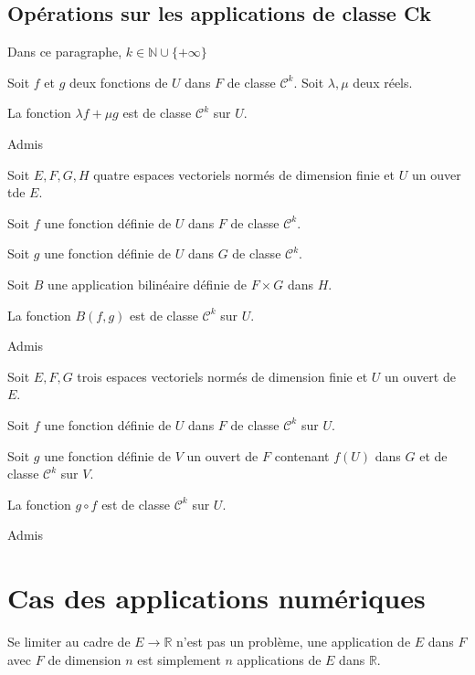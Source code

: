 \documentclass[a4paper,12pt]{book}
\newcommand{\Prop}[2]{\begin{tcolorbox}[sharp corners, colback=white,colframe=red!90!black!75, title=Proposition : #1]#2\end{tcolorbox}}
\newcommand{\Pre}[1]{\begin{tcolorbox}[sharp corners, colback=white,colframe=green!60!green!30!black!75, title=Preuve]#1\end{tcolorbox}}
\def\R{\mathbb{R}}
\def\N{\mathbb{N}}
\begin{document}
\subsection{Opérations sur les applications de classe Ck}
Dans ce paragraphe, $k\in\N\cup\{+\infty\}$
\Prop{}{Soit $f$ et $g$ deux fonctions de $U$ dans $F$ de classe $\mathcal{C}^k$. Soit $\lambda, \mu$ deux réels.
\par La fonction $\lambda f+\mu g$ est de classe $\mathcal{C}^k$ sur $U$.}
\Pre{Admis}
\Prop{}{Soit $E,F,G,H$ quatre espaces vectoriels normés de dimension finie et $U$ un ouver tde $E$.
\par Soit $f$ une fonction définie de $U$ dans $F$ de classe $\mathcal{C}^k$.
\par Soit $g$ une fonction définie de $U$ dans $G$ de classe $\mathcal{C}^k$.
\par Soit $B$ une application bilinéaire définie de $F\times G$ dans $H$.
\par La fonction $B(f, g)$ est de classe $\mathcal{C}^k$ sur $U$.}
\Pre{Admis}
\Prop{}{Soit $E, F,G$ trois espaces vectoriels normés de dimension finie et $U$ un ouvert de $E$.
\par Soit $f$ une fonction définie de $U$ dans $F$ de classe $\mathcal{C}^k$ sur $U$.
\par Soit $g$ une fonction définie de $V$ un ouvert de $F$ contenant $f(U)$ dans $G$ et de classe $\mathcal{C}^k$ sur $V$.
\par La fonction $g\circ f$ est de classe $\mathcal{C}^k$ sur $U$.}
\Pre{Admis}


\section{Cas des applications numériques}
Se limiter au cadre de $E\to\R$ n'est pas un problème, une application de $E$ dans $F$ avec $F$ de dimension $n$ est simplement $n$ applications de $E$ dans $\R$.
\end{document}
